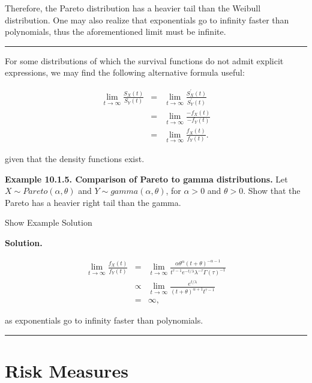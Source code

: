 \documentclass[]{book}
\theoremstyle{definition}
\theoremstyle{definition}
\theoremstyle{definition}
\theoremstyle{remark}
\begin{document}
Therefore, the Pareto distribution has a heavier tail than the Weibull
distribution. One may also realize that exponentials go to infinity
faster than polynomials, thus the aforementioned limit must be infinite.

\begin{center}\rule{0.5\linewidth}{\linethickness}\end{center}

For some distributions of which the survival functions do not admit
explicit expressions, we may find the following alternative formula
useful:

\begin{eqnarray*}
    \lim_{t\to \infty} \frac{S_X(t)}{S_Y(t)} &=& \lim_{t \to \infty} \frac{S_X^{'}(t)}{S_Y^{'}(t)} \\
    &=& \lim_{t \to \infty} \frac{-f_X(t)}{-f_Y(t)}\\
 &=& \lim_{t\to \infty} \frac{f_X(t)}{f_Y(t)}.
\end{eqnarray*}

given that the density functions exist.

\textbf{Example 10.1.5. Comparison of Pareto to gamma distributions.}
Let \(X\sim Pareto(\alpha, \theta)\) and
\(Y\sim gamma(\alpha, \theta)\), for \(\alpha>0\) and \(\theta>0\). Show
that the Pareto has a heavier right tail than the gamma.

Show Example Solution

\hypertarget{toggleExamplePortMgt.1.5}{}
\textbf{Solution.}

\begin{eqnarray*}
    \lim_{t\to \infty} \frac{f_{X}(t)}{f_{Y}(t)} &=& \lim_{t \to \infty} \frac{\alpha \theta^{\alpha} (t+ \theta)^{-\alpha-1}}{t^{\tau-1} e^{-t/\lambda} \lambda^{-\tau} \Gamma(\tau)^{-1}} \\
 &\propto&  \lim_{t\to \infty} \frac{e^{t/\lambda}}{(t+\theta)^{\alpha+1} t^{\tau-1}} \\
    &=& \infty,
\end{eqnarray*}

as exponentials go to infinity faster than polynomials.

\begin{center}\rule{0.5\linewidth}{\linethickness}\end{center}

\section{Risk Measures}\label{S:RiskMeasure}
\end{document}
